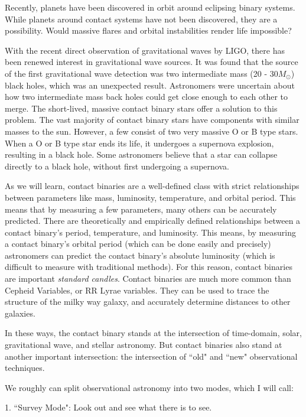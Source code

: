 \documentclass[12pt]{article} %
\numberwithin{equation}{section} %
\begin{document}
Recently, planets have been discovered in orbit around eclipsing binary systems. While planets around contact systems have not been discovered, they are a possibility. Would massive flares and orbital instabilities render life impossible?

With the recent direct observation of gravitational waves by LIGO, there has been renewed interest in gravitational wave sources. It was found that the source of the first gravitational wave detection was two intermediate mass (20 - 30$M_{\odot}$) black holes, which was an unexpected result. Astronomers were uncertain about how two intermediate mass back holes could get close enough to each other to merge. The short-lived, massive contact binary stars offer a solution to this problem. The vast majority of contact binary stars have components with similar masses to the sun. However, a few consist of two very massive O or B type stars. When a O or B type star ends its life, it undergoes a supernova explosion, resulting in a black hole. Some astronomers believe that a star can collapse directly to a black hole, without first undergoing a supernova.

As we will learn, contact binaries are a well-defined class with strict relationships between parameters like mass, luminosity, temperature, and orbital period. This means that by measuring a few parameters, many others can be accurately predicted. There are theoretically and empirically defined relationships between a contact binary's period, temperature, and luminosity. This means, by measuring a contact binary's orbital period (which can be done easily and precisely) astronomers can predict the contact binary's absolute luminosity (which is difficult to measure with traditional methods). For this reason, contact binaries are important \emph{standard candles}. Contact binaries are much more common than Cepheid Variables, or RR Lyrae variables. They can be used to trace the structure of the milky way galaxy, and accurately determine distances to other galaxies.

In these ways, the contact binary stands at the intersection of time-domain, solar, gravitational wave, and stellar astronomy. But contact binaries also stand at another important intersection: the intersection of ``old" and ``new" observational techniques. 

We roughly can split observational astronomy into two modes, which I will call:

1. ``Survey Mode": Look out and see what there is to see.
\end{document}
